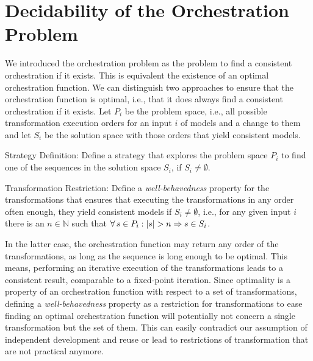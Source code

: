 \section{Decidability of the Orchestration Problem}

We introduced the orchestration problem as the problem to find a consistent orchestration if it exists.
This is equivalent the existence of an optimal orchestration function.
We can distinguish two approaches to ensure that the orchestration function is optimal, i.e., that it does always find a consistent orchestration if it exists.
Let $P_{i}$ be the problem space, i.e., all possible transformation execution orders for an input $i$ of models and a change to them and let $S_{i}$ be the solution space with those orders that yield consistent models.
\begin{properdescription}
    \item[Strategy Definition:] Define a strategy that explores the problem space $P_{i}$ to find one of the sequences in the solution space $S_{i}$, if $S_{i} \neq \emptyset$.
    \item[Transformation Restriction:] Define a \emph{well-behavedness} property for the transformations that ensures that executing the transformations in any order often enough, they yield consistent models if $S_{i} \neq \emptyset$, i.e., for any given input $i$ there is an $n \in \mathbb{N}$ such that $\forall s \in P_{i} : \abs{s} > n \Rightarrow s \in S_{i}$.
\end{properdescription}


In the latter case, the orchestration function may return any order of the transformations, as long as the sequence is long enough to be optimal.
This means, performing an iterative execution of the transformations leads to a consistent result, comparable to a fixed-point iteration.
Since optimality is a property of an orchestration function with respect to a set of transformations, defining a \emph{well-behavedness} property as a restriction for transformations to ease finding an optimal orchestration function will potentially not concern a single transformation but the set of them.
This can easily contradict our assumption of independent development and reuse or lead to restrictions of transformation that are not practical anymore.

